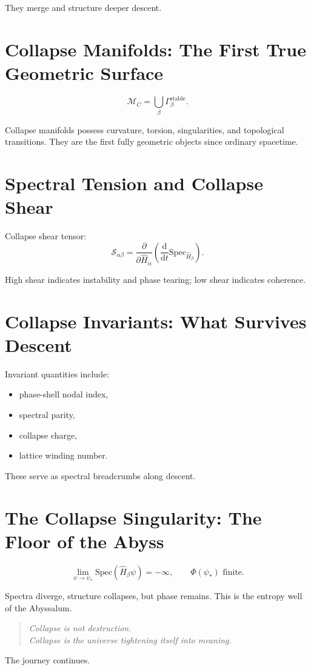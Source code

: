 They merge and structure deeper descent.

\section{Collapse Manifolds: The First True Geometric Surface}
\[
\mathcal{M}_C =
\bigcup_{\beta}
\Gamma_\beta^{\mathrm{stable}}.
\]

Collapse manifolds possess curvature, torsion, singularities, and topological transitions.
They are the first fully geometric objects since ordinary spacetime.

\section{Spectral Tension and Collapse Shear}
Collapse shear tensor:
\[
\mathcal{S}_{\alpha\beta}
=
\frac{\partial}{\partial \hat{H}_\alpha}
\left(
\frac{\mathrm{d}}{\mathrm{d}t}
\mathrm{Spec}_{\hat{H}_\beta}
\right).
\]

High shear indicates instability and phase tearing; low shear indicates coherence.

\section{Collapse Invariants: What Survives Descent}
Invariant quantities include:
\begin{itemize}
  \item phase-shell nodal index,
  \item spectral parity,
  \item collapse charge,
  \item lattice winding number.
\end{itemize}

These serve as spectral breadcrumbs along descent.

\section{The Collapse Singularity: The Floor of the Abyss}
\[
\lim_{\psi \to \psi_*}
\mathrm{Spec}(\hat{H}_\beta \psi) = -\infty,
\qquad
\Phi(\psi_*) \text{ finite}.
\]

Spectra diverge, structure collapses, but phase remains.
This is the entropy well of the Abyssalum.

\begin{quote}
\emph{
Collapse is not destruction.\\
Collapse is the universe tightening itself into meaning.
}
\end{quote}

The journey continues.
